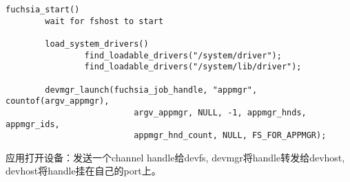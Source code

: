 \begin{verbatim}
fuchsia_start()
        wait for fshost to start
        
        load_system_drivers()
                find_loadable_drivers("/system/driver");
                find_loadable_drivers("/system/lib/driver");

        devmgr_launch(fuchsia_job_handle, "appmgr", countof(argv_appmgr),
                          argv_appmgr, NULL, -1, appmgr_hnds, appmgr_ids,
                          appmgr_hnd_count, NULL, FS_FOR_APPMGR);

\end{verbatim}

应用打开设备：发送一个channel handle给devfs, devmgr将handle转发给devhost, 
devhost将handle挂在自己的port上。

